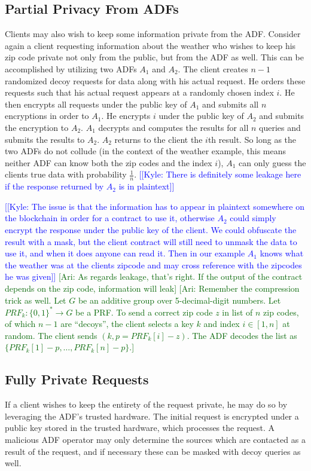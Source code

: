 \documentclass[letterpaper,twocolumn,10pt]{article}
\newcommand{\kyle}[1]{\textcolor{blue}{[[\textsf{Kyle:  #1}]]}}
\newcommand{\ari}[1]{\textcolor{darkgreen}{[\textsf{Ari:  #1}]}}
\begin{document}
\subsection{Partial Privacy From ADFs}
    Clients may also wish to keep some information private from the ADF.  Consider again a client requesting information about the weather who wishes to keep his zip code private not only from the public, but from the ADF as well.  This can be accomplished by utilizing two ADFs $A_1$ and $A_2$.  The client creates $n-1$ randomized decoy requests for data along with his actual request.  He orders these requests such that his actual request appears at a randomly chosen index $i$.  He then encrypts all requests under the public key of $A_1$ and submits all $n$ encryptions in order to $A_1$.  He encrypts $i$ under the public key of $A_2$ and submits the encryption to $A_2$.  $A_1$ decrypts and computes the results for all $n$ queries and submits the results to $A_2$.  $A_2$ returns to the client the $i$th result.  So long as the two ADFs do not collude (in the context of the weather example, this means neither ADF can know both the zip codes and the index $i$), $A_1$ can only guess the clients true data with probability $\frac{1}{n}$.  \kyle{There is definitely some leakage here if the response returned by $A_2$ is in plaintext} 
    
    
    \kyle{The issue is that the information has to appear in plaintext somewhere on the blockchain in order for a contract to use it, otherwise $A_2$ could simply encrypt the response under the public key of the client.  We could obfuscate the result with a mask, but the client contract will still need to unmask the data to use it, and when it does anyone can read it.  Then in our example $A_1$ knows what the weather was at the clients zipcode and may cross reference with the zipcodes he was given}
    \ari{As regards leakage, that's right. If the output of the contract depends on the zip code, information will leak}
    \ari{Remember the compression trick as well. Let $G$ be an additive group over 5-decimal-digit numbers. Let $PRF_k: \{0,1\}^{*} \rightarrow G$ be a PRF. To send a correct zip code $z$ in list of $n$ zip codes, of which $n-1$ are ``decoys'', the client selects a key $k$ and index $i \in [1,n]$ at random. The client sends $(k,p = PRF_k[i] - z)$. The ADF decodes the list as $\{PRF_k[1] - p, \ldots, PRF_k[n]  - p\}$.}

\subsection{Fully Private Requests}
    If a client wishes to keep the entirety of the request private, he may do so by leveraging the ADF's trusted hardware.  The initial request is encrypted under a public key stored in the trusted hardware, which processes the request.  A malicious ADF operator may only determine the sources which are contacted as a result of the request, and if necessary these can be masked with decoy queries as well.
\end{document}
